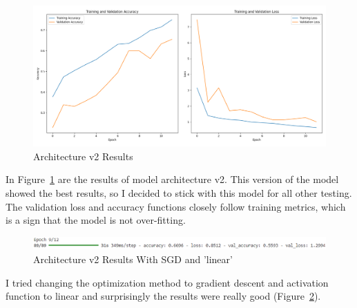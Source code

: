 \documentclass{article}
\begin{document}
\begin{figure}[H]
    \centering
    \includegraphics[width=1\textwidth]{results-2.png}
    \caption{Architecture v2 Results}
    \label{fig:results-2}
\end{figure}
In Figure~\ref{fig:results-2} are the results of model architecture v2. This version of the model showed the best results, so I decided to stick with this model for all other testing. The validation loss and accuracy functions closely follow training metrics, which is a sign that the model is not over-fitting.
\begin{figure}[H]
    \centering
    \includegraphics[width=1\textwidth]{gradient-linear.png}
    \caption{Architecture v2 Results With SGD and 'linear'}
    \label{fig:gradient-linear}
\end{figure}
I tried changing the optimization method to gradient descent and activation function to linear and surprisingly the results were really good (Figure~\ref{fig:gradient-linear}).
\end{document}
